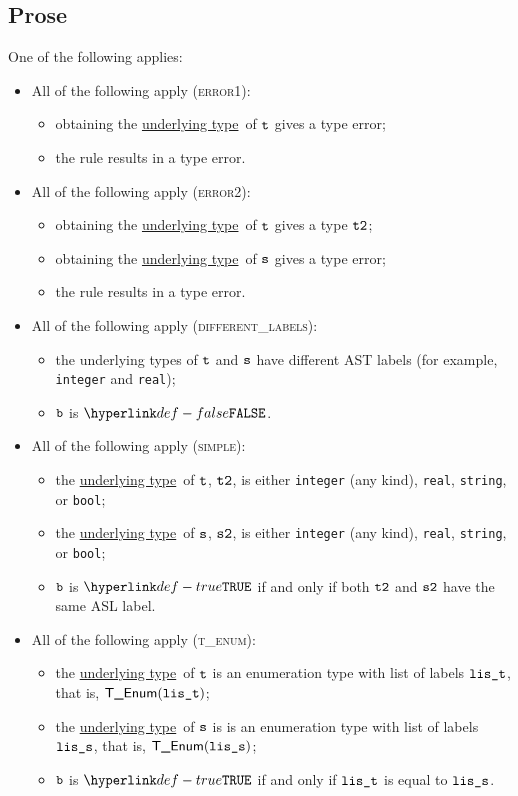 \documentclass{book}
\newcommand\underlyingtype[0]{\hyperlink{def-underlyingtype}{underlying type}}
\begin{document}
\subsection{Prose}
One of the following applies:
\begin{itemize}
\item All of the following apply (\textsc{error1}):
  \begin{itemize}
  \item obtaining the \underlyingtype\ of $\texttt{t}$ gives a type error;
  \item the rule results in a type error.
  \end{itemize}

\item All of the following apply (\textsc{error2}):
  \begin{itemize}
    \item obtaining the \underlyingtype\ of $\texttt{t}$ gives a type $\texttt{t2}$;
    \item obtaining the \underlyingtype\ of $\texttt{s}$ gives a type error;
    \item the rule results in a type error.
    \end{itemize}

\item All of the following apply (\textsc{different\_labels}):
  \begin{itemize}
  \item the underlying types of $\texttt{t}$ and $\texttt{s}$ have different AST labels
  (for example, \texttt{integer} and \texttt{real});
  \item $\texttt{b}$ is $\False$.
  \end{itemize}

\item All of the following apply (\textsc{simple}):
  \begin{itemize}
  \item the \underlyingtype\ of $\texttt{t}$, $\texttt{t2}$, is either \texttt{integer} (any kind), \texttt{real}, \texttt{string}, or \texttt{bool};
  \item the \underlyingtype\ of $\texttt{s}$, $\texttt{s2}$, is either \texttt{integer} (any kind), \texttt{real}, \texttt{string}, or \texttt{bool};
  \item $\texttt{b}$ is $\True$ if and only if both $\texttt{t2}$ and $\texttt{s2}$ have the same ASL label.
  \end{itemize}

\item All of the following apply (\textsc{t\_enum}):
  \begin{itemize}
  \item the \underlyingtype\ of $\texttt{t}$ is an enumeration type with list of labels $\texttt{lis\_t}$, that is, $\textsf{T\_Enum}(\texttt{lis\_t})$;
  \item the \underlyingtype\ of $\texttt{s}$ is is an enumeration type with list of labels $\texttt{lis\_s}$, that is, $\textsf{T\_Enum}(\texttt{lis\_s})$;
  \item $\texttt{b}$ is $\True$ if and only if $\texttt{lis\_t}$ is equal to $\texttt{lis\_s}$.
  \end{itemize}


\end{itemize}
\end{document}
